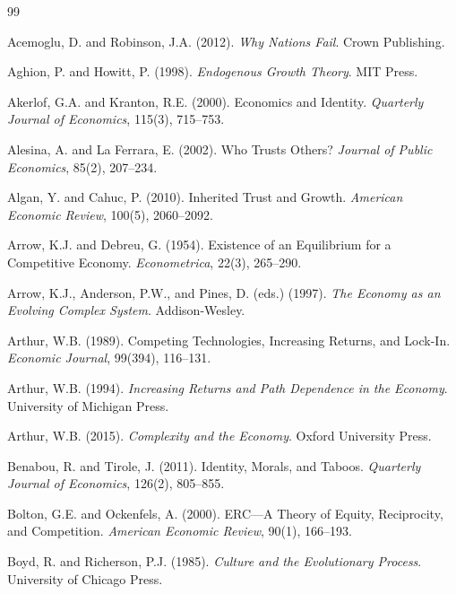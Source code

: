 \documentclass[12pt,a4paper]{article}
\begin{document}

\begin{thebibliography}{99}

Acemoglu, D. and Robinson, J.A. (2012).  
\emph{Why Nations Fail}. Crown Publishing.

Aghion, P. and Howitt, P. (1998).  
\emph{Endogenous Growth Theory}. MIT Press.

Akerlof, G.A. and Kranton, R.E. (2000).  
Economics and Identity.  
\emph{Quarterly Journal of Economics}, 115(3), 715–753.

Alesina, A. and La Ferrara, E. (2002).
Who Trusts Others?
\emph{Journal of Public Economics}, 85(2), 207–234.

Algan, Y. and Cahuc, P. (2010).
Inherited Trust and Growth.
\emph{American Economic Review}, 100(5), 2060–2092.

Arrow, K.J. and Debreu, G. (1954).  
Existence of an Equilibrium for a Competitive Economy.  
\emph{Econometrica}, 22(3), 265–290.

Arrow, K.J., Anderson, P.W., and Pines, D. (eds.) (1997).
\emph{The Economy as an Evolving Complex System}.
Addison-Wesley.

Arthur, W.B. (1989).
Competing Technologies, Increasing Returns, and Lock-In.
\emph{Economic Journal}, 99(394), 116–131.

Arthur, W.B. (1994).
\emph{Increasing Returns and Path Dependence in the Economy}.
University of Michigan Press.

Arthur, W.B. (2015).
\emph{Complexity and the Economy}.
Oxford University Press.

Benabou, R. and Tirole, J. (2011).  
Identity, Morals, and Taboos.  
\emph{Quarterly Journal of Economics}, 126(2), 805–855.

Bolton, G.E. and Ockenfels, A. (2000).  
ERC—A Theory of Equity, Reciprocity, and Competition.  
\emph{American Economic Review}, 90(1), 166–193.

Boyd, R. and Richerson, P.J. (1985).
\emph{Culture and the Evolutionary Process}.
University of Chicago Press.


\end{thebibliography}
\end{document}
